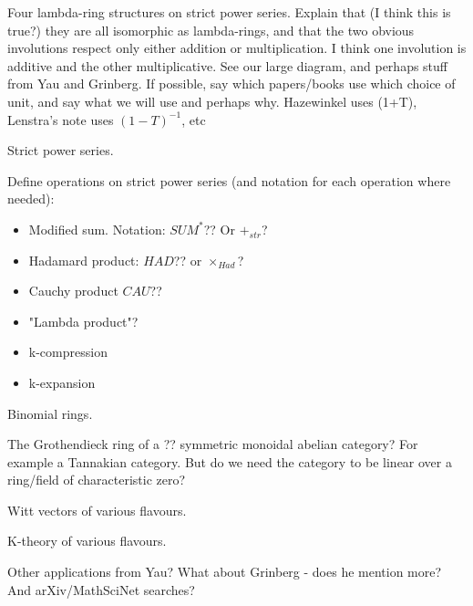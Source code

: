 \begin{example}
Four lambda-ring structures on strict power series. Explain that (I think this is true?) they are all isomorphic as lambda-rings, and that the two obvious involutions respect only either addition or multiplication. I think one involution is additive and the other multiplicative. See our large diagram, and perhaps stuff from Yau and Grinberg. If possible, say which papers/books use which choice of unit, and say what we will use and perhaps why. Hazewinkel uses (1+T), Lenstra's note uses $(1-T)^{-1}$, etc
\end{example}




\begin{definition}
\item Strict power series.
\end{definition}

Define operations on strict power series (and notation for each operation where needed):
\begin{itemize}
\item Modified sum. Notation: $SUM^{*}$?? Or $+_{str}$?
\item Hadamard product: $HAD$?? or $\times_{Had}$?
\item Cauchy product $CAU$?? 
\item "Lambda product"?
\item k-compression
\item k-expansion
\end{itemize}



\begin{example}
Binomial rings.
\end{example}

\begin{example}
The Grothendieck ring of a ?? symmetric monoidal abelian category? For example a Tannakian category. But do we need the category to be linear over a ring/field of characteristic zero?
\end{example}

\begin{example}
Witt vectors of various flavours.
\end{example}

\begin{example}
K-theory of various flavours.
\end{example}

\begin{example}
Other applications from Yau? What about Grinberg - does he mention more? And arXiv/MathSciNet searches?
\end{example}




